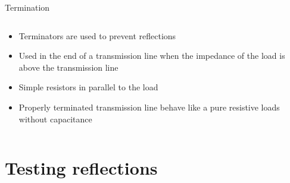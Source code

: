 \documentclass{beamer}
\begin{document}
\begin{frame}{Termination}
\begin{columns}
  \begin{column}{0.48\textwidth}
   \begin{itemize}
    \item Terminators are used to prevent reflections
    \item Used in the end of a transmission line when the impedance of
          the load is above the transmission line
    \item Simple resistors in parallel to the load
    \item Properly terminated transmission line behave like a pure resistive loads without capacitance
   \end{itemize}
  \end{column}
  \begin{column}{0.48\textwidth}
  \end{column}
\end{columns}
\end{frame}

\section{Testing reflections}\label{secReflection}
\end{document}
